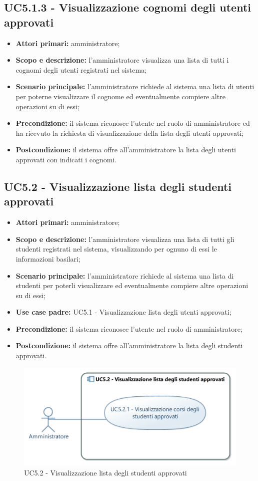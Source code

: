 \documentclass[AnalisiDeiRequisiti.tex]{subfiles}
\begin{document}
\subsection{UC5.1.3 - Visualizzazione cognomi degli utenti approvati}
\begin{itemize}
	\item \textbf{Attori primari:} amministratore;
	\item \textbf{Scopo e descrizione:} l'amministratore visualizza una lista di tutti i cognomi degli utenti registrati nel sistema;
	\item \textbf{Scenario principale:} l'amministratore richiede al sistema una lista di utenti per poterne visualizzare il cognome ed eventualmente compiere altre operazioni su di essi;
	\item \textbf{Precondizione:} il sistema riconosce l'utente nel ruolo di amministratore ed ha ricevuto la richiesta di visualizzazione della lista degli utenti approvati;
	\item \textbf{Postcondizione:} il sistema offre all'amministratore la lista degli utenti approvati con indicati i cognomi.
\end{itemize}
\subsection{UC5.2 - Visualizzazione lista degli studenti approvati}
\begin{itemize}
	\item \textbf{Attori primari:} amministratore;
	\item \textbf{Scopo e descrizione:} l'amministratore visualizza una lista di tutti gli studenti registrati nel sistema, visualizzando per ognuno di essi le informazioni basilari;
	\item \textbf{Scenario principale:} l'amministratore richiede al sistema una lista di studenti per poterli visualizzare ed eventualmente compiere altre operazioni su di essi;
	\item \textbf{Use case padre:} UC5.1 - Visualizzazione lista degli utenti approvati;
	\item \textbf{Precondizione:} il sistema riconosce l'utente nel ruolo di amministratore; 
	\item \textbf{Postcondizione:} il sistema offre all'amministratore la lista degli studenti approvati.
\end{itemize}
\begin{figure}[H]
	\centering
	\includegraphics[width=0.9\linewidth]{UC5_2.jpg}
	\caption{UC5.2 - Visualizzazione lista degli studenti approvati}
	\label{fig:UC5.2 - Visualizzazione lista degli studenti approvati}
\end{figure}
\end{document}

